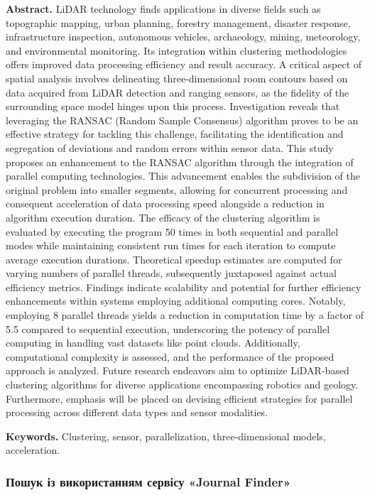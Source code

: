 \documentclass{article}
\begin{document}
\textbf{Abstract.}
LiDAR technology finds applications in diverse fields such as topographic mapping, urban planning, forestry management, disaster response, infrastructure inspection, autonomous vehicles, archaeology, mining, meteorology, and environmental monitoring. Its integration within clustering methodologies offers improved data processing efficiency and result accuracy. A critical aspect of spatial analysis involves delineating three-dimensional room contours based on data acquired from LiDAR detection and ranging sensors, as the fidelity of the surrounding space model hinges upon this process. Investigation reveals that leveraging the RANSAC (Random Sample Consensus) algorithm proves to be an effective strategy for tackling this challenge, facilitating the identification and segregation of deviations and random errors within sensor data. This study proposes an enhancement to the RANSAC algorithm through the integration of parallel computing technologies. This advancement enables the subdivision of the original problem into smaller segments, allowing for concurrent processing and consequent acceleration of data processing speed alongside a reduction in algorithm execution duration. The efficacy of the clustering algorithm is evaluated by executing the program 50 times in both sequential and parallel modes while maintaining consistent run times for each iteration to compute average execution durations. Theoretical speedup estimates are computed for varying numbers of parallel threads, subsequently juxtaposed against actual efficiency metrics. Findings indicate scalability and potential for further efficiency enhancements within systems employing additional computing cores. Notably, employing 8 parallel threads yields a reduction in computation time by a factor of 5.5 compared to sequential execution, underscoring the potency of parallel computing in handling vast datasets like point clouds. Additionally, computational complexity is assessed, and the performance of the proposed approach is analyzed. Future research endeavors aim to optimize LiDAR-based clustering algorithms for diverse applications encompassing robotics and geology. Furthermore, emphasis will be placed on devising efficient strategies for parallel processing across different data types and sensor modalities.

\textbf{Keywords.}
Clustering, sensor, parallelization, three-dimensional models, acceleration.

\subsubsection{Пошук із використанням сервісу «Journal Finder»}
\end{document}
